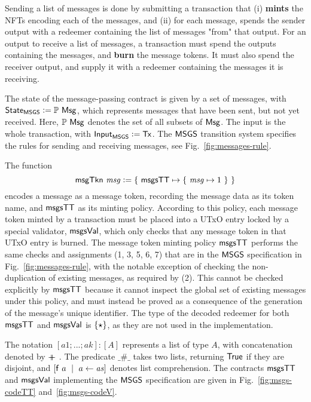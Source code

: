 Sending a list of messages is done by submitting a transaction that (i) \textbf{mints} the
NFTs encoding each of the messages, and (ii) for each message, spends the sender
output with a redeemer containing the list of messages "from" that output.
For an output to receive a list of messages, a transaction must spend the outputs containing the
messages, and \textbf{burn} the message tokens. It must also spend the receiver output,
and supply it with a redeemer containing the messages it is receiving.

The state of the message-passing contract is given by a set of messages, with
$\mathsf{State}_{\mathsf{MSGS}} \mathrel{\mathop:}= \mathbb{P}~\mathsf{Msg}$, which represents
messages that have been sent, but not yet received. Here, $\mathbb{P}~\mathsf{Msg}$
denotes the set of all subsets of $\mathsf{Msg}$.
The input is the whole transaction, with $\mathsf{Input}_{\mathsf{MSGS}} \mathrel{\mathop:}= \mathsf{Tx}$.
The $\mathsf{MSGS}$ transition system specifies the rules for sending and
receiving messages, see Fig.~\ref{fig:messages-rule}.

The function
\[\mathsf{msgTkn} ~\mathit{msg} \mathrel{\mathop:}= \{ ~\mathsf{msgsTT} \mapsto \{~\mathit{msg} \mapsto 1~\}~\}\]
encodes a message as a message token, recording the message data as its token name,
and $\mathsf{msgsTT}$ as its minting policy. According to this policy, each message token minted by
a transaction must be placed into a UTxO entry locked by a special validator, $\mathsf{msgsVal}$,
which only checks that any message token in that UTxO entry
is burned. The message token minting policy $\mathsf{msgsTT}$ performs the same
checks and assignments (1, 3, 5, 6, 7) that are in the $\mathsf{MSGS}$ specification in Fig.~\ref{fig:messages-rule},
with the notable exception of checking the non-duplication of existing messages,
as required by (2). This cannot be checked explicitly by $\mathsf{msgsTT}$ because
it cannot inspect the global set of existing messages under this policy, and
must instead be proved as a consequence of the generation of the message's unique
identifier. The type of the decoded redeemer for both $\mathsf{msgsTT}$ and
$\mathsf{msgsVal}$ is $\{\star\}$, as they are not used in the implementation.

The notation $[a1; ... ; ak] : [A]$ represents a list of type $A$, with concatenation
denoted by $+\!\!\!\!+\ $. The predicate $\_ \# \_$ takes two lists, returning $\mathsf{True}$ if
they are disjoint, and $[ \mathsf{f}~a~ \mid~ a \leftarrow \mathit{as}]$ denotes list comprehension.
The contracts $\mathsf{msgsTT}$ and $\mathsf{msgsVal}$ implementing the $\mathsf{MSGS}$ specification
are given in Fig.~\ref{fig:msgs-codeTT} and~\ref{fig:msgs-codeV}.

